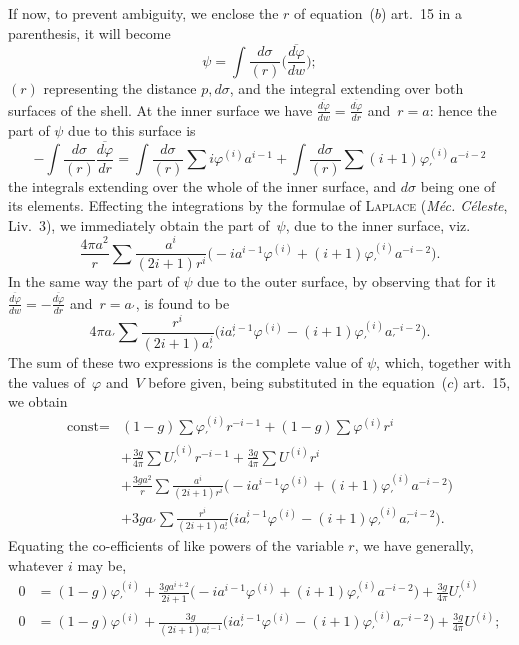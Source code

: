 \documentclass[11pt,notitlepage]{amsart}
\let\Person\textsc
\let\Title\textit
\renewcommand{\phi}{\varphi}
\begin{document}
If now, to prevent ambiguity, we enclose the $r$ of equation~($b$) art.~15
in a parenthesis, it will become
\[
\psi=\int\frac{d\sigma}{(r)}\biggl(\frac{\overline{d\phi}}{dw}\biggr);
\]
$(r)$ representing the distance $p,d\sigma$,
and the integral extending over both
surfaces of the shell. At the inner surface we have
$\frac{\overline{d\phi}}{dw}=\frac{\overline{d\phi}}{dr}$
and~$r=a$:
hence the part of $\psi$ due to this surface is
\[
-\int\frac{d\sigma}{(r)}\frac{\overline{d\phi}}{dr}
=\int\frac{d\sigma}{(r)}\sum i\phi^{(i)}a^{i-1}
+\int\frac{d\sigma}{(r)}\sum (i+1)\phi_\prime^{(i)}a^{-i-2}
\]
the integrals extending over the whole of the inner surface, and $d\sigma$ being
one of its elements. Effecting the integrations
by the formulae of \Person{Laplace}
(\Title{M\'ec. C\'eleste}, Liv.~3),
we immediately obtain the part of~$\psi$, due to the inner
surface, viz.
\[
\frac{4\pi a^2}{r}\sum\frac{a^i}{(2i+1)r^i}
\bigl(-ia^{i-1}\phi^{(i)}+(i+1)\phi_\prime^{(i)}a^{-i-2}\bigr).
\]
In the same way the part of $\psi$ due to the outer surface, by observing that
for it $\frac{\overline{d\phi}}{dw}=-\frac{\overline{d\phi}}{dr}$
and~$r=a_\prime$, is found to be
\[
4\pi a_\prime \sum\frac{r^i}{(2i+1)a_\prime^i}
\bigl(ia_\prime^{i-1}\phi^{(i)}-(i+1)\phi_\prime^{(i)}a_\prime^{-i-2}\bigr).
\]
The sum of these two expressions is the complete value of $\psi$,
which, together
with the values of~$\phi$ and~$V$ before given,
being substituted in the equation~($c$)
art.~15, we obtain
\[
\begin{aligned}
\text{const}=
&(1-g)\sum\phi_\prime^{(i)}r^{-i-1}
+(1-g)\sum\phi^{(i)}r^{i}\\
&+\frac{3g}{4\pi}\sum U_\prime^{(i)}r^{-i-1}
+\frac{3g}{4\pi}\sum U^{(i)}r^{i}\\
&+\frac{3ga^2}{r}\sum\frac{a^i}{(2i+1)r^i}
\bigl(-ia^{i-1}\phi^{(i)}+(i+1)\phi_\prime^{(i)}a^{-i-2}\bigr)\\
&+3ga_\prime \sum\frac{r^i}{(2i+1)a_\prime^i}
\bigl(ia_\prime^{i-1}\phi^{(i)}-(i+1)\phi_\prime^{(i)}a_\prime^{-i-2}\bigr).
\end{aligned}
\]
Equating the co-efficients of like powers of the variable $r$,
we have generally,
whatever $i$ may be,
\[
\begin{aligned}
0 &= (1-g)\phi_\prime^{(i)}+\frac{3ga^{i+2}}{2i+1}
\bigl(-ia^{i-1}\phi^{(i)}+(i+1)\phi_\prime^{(i)}a^{-i-2}\bigr)
+\frac{3g}{4\pi}U_\prime^{(i)}\\
0 &= (1-g)\phi^{(i)}+\frac{3g}{(2i+1)a_\prime^{i-1}}
\bigl(ia_\prime^{i-1}\phi^{(i)}-(i+1)\phi_\prime^{(i)}a_\prime^{-i-2}\bigr)
+\frac{3g}{4\pi}U^{(i)};
\end{aligned}
\]
\end{document}
